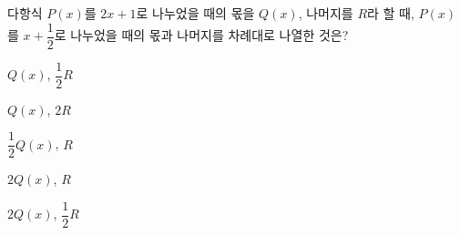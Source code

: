 다항식 $P(x)$를 $2x+1$로 나누었을 때의 몫을 $Q(x)$, 나머지를 $R$라 할 때, $P(x)$를 $x+\dfrac{1}{2}$로 나누었을 때의 몫과 나머지를 차례대로 나열한 것은?
\begin{choicesii}{\rule[-3ex]{0pt}{8ex}$Q(x)$, $\dfrac{1}{2}R$}{\rule[-3ex]{0pt}{8ex}$Q(x)$, $2R$}{\rule[-3ex]{0pt}{8ex}$\dfrac{1}{2}Q(x)$, $R$}{\rule[-3ex]{0pt}{8ex}$2Q(x)$, $R$}{\rule[-3ex]{0pt}{8ex}$2Q(x)$, $\dfrac{1}{2}R$}\end{choicesii}
